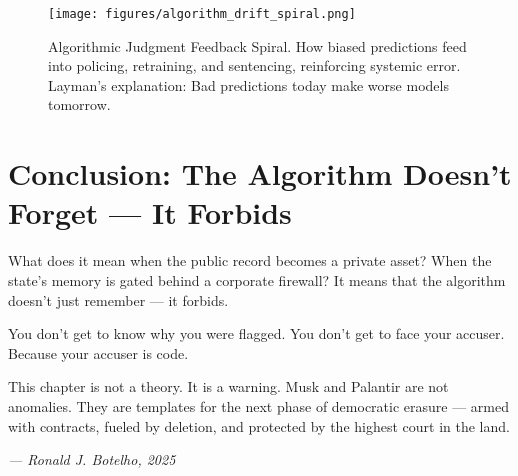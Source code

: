 \begin{figure}[h!]
  \centering
  \texttt{[image: figures/algorithm\_drift\_spiral.png]}
  \caption{Algorithmic Judgment Feedback Spiral. How biased predictions feed into policing, retraining, and sentencing, reinforcing systemic error. Layman's explanation: Bad predictions today make worse models tomorrow.}
\end{figure}

\section*{Conclusion: The Algorithm Doesn’t Forget — It Forbids}
What does it mean when the public record becomes a private asset? When the state’s memory is gated behind a corporate firewall? It means that the algorithm doesn’t just remember — it forbids.

You don’t get to know why you were flagged.  
You don’t get to face your accuser.  
Because your accuser is code.

This chapter is not a theory. It is a warning.  
Musk and Palantir are not anomalies.  
They are templates for the next phase of democratic erasure — armed with contracts, fueled by deletion, and protected by the highest court in the land.

\vspace{1em}

\begin{flushright}
\textit{--- Ronald J. Botelho, 2025}
\end{flushright}
